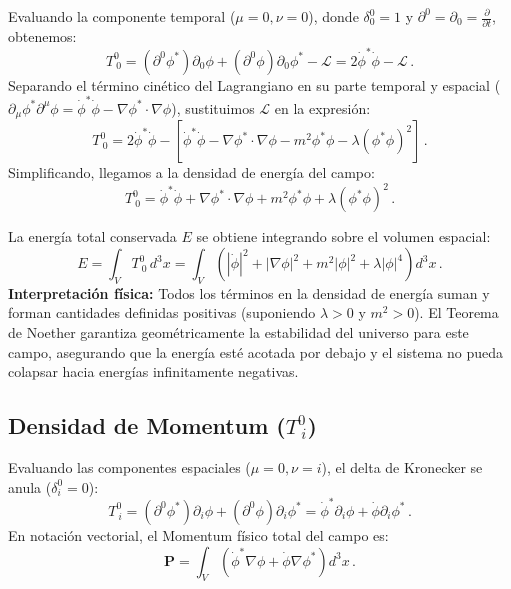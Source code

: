 Evaluando la componente temporal ($\mu=0, \nu=0$), donde $\delta^0_0 = 1$ y $\partial^0 = \partial_0 = \frac{\partial}{\partial t}$, obtenemos:
\begin{equation}
    T^0_{\ 0} = (\partial^0 \phi^*) \partial_0 \phi + (\partial^0 \phi) \partial_0 \phi^* - \mathcal{L} = 2\dot{\phi}^*\dot{\phi} - \mathcal{L} \, .
\end{equation}
Separando el término cinético del Lagrangiano en su parte temporal y espacial ($\partial_\mu \phi^* \partial^\mu \phi = \dot{\phi}^*\dot{\phi} - \nabla\phi^* \cdot \nabla\phi$), sustituimos $\mathcal{L}$ en la expresión:
\begin{equation}
    T^0_{\ 0} = 2\dot{\phi}^*\dot{\phi} - \left[ \dot{\phi}^*\dot{\phi} - \nabla\phi^* \cdot \nabla\phi - m^2\phi^* \phi - \lambda(\phi^* \phi)^2 \right] \, .
\end{equation}
Simplificando, llegamos a la densidad de energía del campo:
\begin{equation}
    T^0_{\ 0} = \dot{\phi}^*\dot{\phi} + \nabla\phi^* \cdot \nabla\phi + m^2\phi^* \phi + \lambda(\phi^* \phi)^2 \, .
\end{equation}

La energía total conservada $E$ se obtiene integrando sobre el volumen espacial:
\begin{equation}
    E = \int_V T^0_{\ 0} \, d^3x = \int_V \left( |\dot{\phi}|^2 + |\nabla\phi|^2 + m^2|\phi|^2 + \lambda|\phi|^4 \right) d^3x \, .
\end{equation}
\textbf{Interpretación física:} Todos los términos en la densidad de energía suman y forman cantidades definidas positivas (suponiendo $\lambda > 0$ y $m^2 > 0$). El Teorema de Noether garantiza geométricamente la estabilidad del universo para este campo, asegurando que la energía esté acotada por debajo y el sistema no pueda colapsar hacia energías infinitamente negativas.

\subsection{Densidad de Momentum ($T^0_{\ i}$)}

Evaluando las componentes espaciales ($\mu=0, \nu=i$), el delta de Kronecker se anula ($\delta^0_i = 0$):
\begin{equation}
    T^0_{\ i} = (\partial^0 \phi^*) \partial_i \phi + (\partial^0 \phi) \partial_i \phi^* = \dot{\phi}^* \partial_i \phi + \dot{\phi} \partial_i \phi^* \, .
\end{equation}
En notación vectorial, el Momentum físico total del campo es:
\begin{equation}
    \mathbf{P} = \int_V \left( \dot{\phi}^* \nabla \phi + \dot{\phi} \nabla \phi^* \right) d^3x \, .
    \label{eq:momentum_clasico}
\end{equation}

